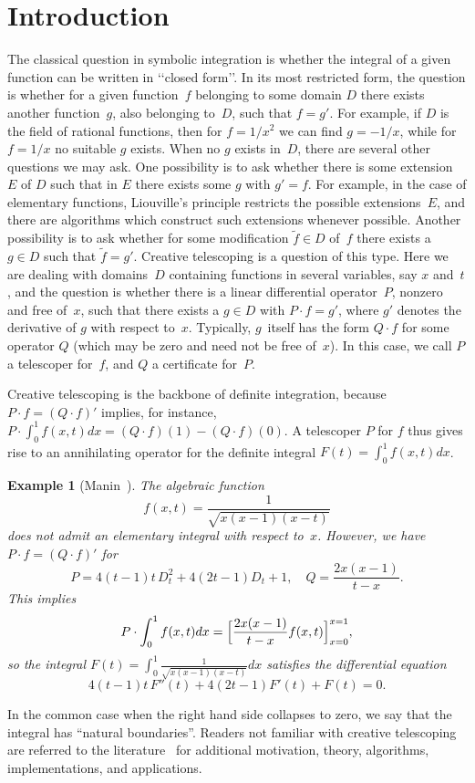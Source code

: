 \documentclass{sig-alternate}
\newtheorem{example}[theorem]{Example}
\begin{document}


\section{Introduction}\label{SECT:intro}

The classical question in symbolic integration is whether the integral of
a given function can be written in \lq\lq closed form\rq\rq. In its most restricted form,
the question is whether for a given function~$f$ belonging to some domain $D$
there exists another function~$g$, also belonging to~$D$, such that $f=g'$. For
example, if $D$ is the field of rational functions, then for $f=1/x^2$ we can
find $g=-1/x$, while for $f=1/x$ no suitable $g$ exists. When no $g$ exists
in~$D$, there are several other questions we may ask. One possibility is to ask
whether there is some extension~$E$ of $D$ such that in $E$ there exists some
$g$ with $g'=f$. For example, in the case of elementary functions, Liouville's
principle restricts the possible extensions~$E$, and there are algorithms which
construct such extensions whenever possible. Another possibility is
to ask whether for some modification $\tilde f\in D$ of~$f$ there exists a $g\in
D$ such that $\tilde f=g'$. Creative telescoping is a question of this
type. Here we are dealing with domains~$D$ containing functions in several
variables, say $x$ and~$t$, and the question is whether there is a linear
differential operator~$P$, nonzero and free of~$x$, such that there exists a
$g\in D$ with $P\cdot f=g'$, where $g'$ denotes the derivative of $g$ with
respect to~$x$. Typically, $g$~itself has the form $Q\cdot f$ for some operator
$Q$ (which may be zero and need not be free of~$x$). In this case, we call $P$
a telescoper for~$f$, and $Q$ a certificate for~$P$.

Creative telescoping is the backbone of definite integration, because
$P\cdot f=(Q\cdot f)'$ implies, for instance, $P\cdot\int_0^1 f(x,t)dx = (Q\cdot f)(1) - (Q\cdot f)(0)$.
A telescoper $P$ for $f$ thus gives rise to an annihilating operator for the
definite integral $F(t)=\int_0^1 f(x,t)dx$.
\begin{example}[Manin~\cite{manin1958}]
  The algebraic function
  \[ f(x,t)=\frac1{\sqrt{x(x-1)(x-t)}}\]
  does not admit an elementary integral with respect to~$x$.
  However, we have $P\cdot f=(Q\cdot f)'$ for
  \[
    P=4(t-1)t\,D_t^2 + 4(2t-1)D_t+1,\quad Q=\frac{2x(x-1)}{t-x}.
  \]
  This implies
  \[
    P\cdot \int_0^1 f(x,t)dx = \Bigl[\frac{2x(x-1)}{t-x}f(x,t)\Bigr]_{x=0}^{x=1},
  \]
  so the integral $F(t)=\int_0^1\frac1{\sqrt{x(x-1)(x-t)}}dx$ satisfies the differential equation
  \[
    4(t-1)t\,F''(t) + 4(2t-1)F'(t) + F(t) = 0.
  \]
\end{example}
In the common case when the right hand side
collapses to zero, we say that the integral has ``natural boundaries''.
Readers not familiar with creative telescoping are referred to the
literature~\cite{PWZbook1996,Zeilberger1990c,Zeilberger1991,Zeilberger1990,Koepf1998,kauers11}
for additional motivation, theory, algorithms, implementations, and applications.
\end{document}
